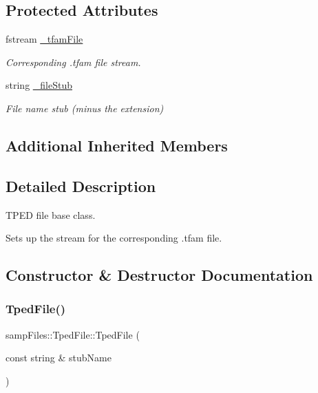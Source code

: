 \subsection*{Protected Attributes}
\begin{DoxyCompactItemize}
\item 
\mbox{\label{classsamp_files_1_1_tped_file_a1f1bd5cfa3710708d9d82150f0941fe8}} 
fstream \hyperlink{classsamp_files_1_1_tped_file_a1f1bd5cfa3710708d9d82150f0941fe8}{\+\_\+tfam\+File}
\begin{DoxyCompactList}\small\item\em Corresponding .tfam file stream. \end{DoxyCompactList}\item 
\mbox{\label{classsamp_files_1_1_tped_file_a7f791300429a132b61427de476d995e4}} 
string \hyperlink{classsamp_files_1_1_tped_file_a7f791300429a132b61427de476d995e4}{\+\_\+file\+Stub}
\begin{DoxyCompactList}\small\item\em File name stub (minus the extension) \end{DoxyCompactList}\end{DoxyCompactItemize}
\subsection*{Additional Inherited Members}


\subsection{Detailed Description}
T\+P\+ED file base class. 

Sets up the stream for the corresponding .tfam file. 

\subsection{Constructor \& Destructor Documentation}
\mbox{\label{classsamp_files_1_1_tped_file_a9796141665192340a076db97810c6699}} 
\subsubsection{\texorpdfstring{Tped\+File()}{TpedFile()}}
{\footnotesize\ttfamily samp\+Files\+::\+Tped\+File\+::\+Tped\+File (\begin{DoxyParamCaption}\item[{const string \&}]{stub\+Name }\end{DoxyParamCaption})\hspace{0.3cm}{\ttfamily [inline]}}



